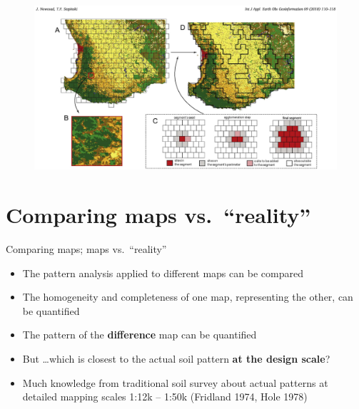 \documentclass[aspectratio=169]{beamer}
\begin{document}
\newpage
    \begin{figure}
        \centering        \includegraphics[height=0.9\textheight]{graphics_david/10.1016.j.jag.2018.03_Fig1.png}
    \end{figure}

\section{Comparing maps vs.\ ``reality''}

\begin{frame}{Comparing maps; maps vs.\ ``reality''}
    \begin{itemize}
        \item The pattern analysis applied to different maps can be compared
        \item The homogeneity and completeness of one map, representing the other, can be quantified
        \item The pattern of the \textbf{difference} map can be quantified
        \item But \ldots which is closest to the actual soil pattern \textbf{at the design scale}?
        \item Much knowledge from traditional soil survey about actual patterns at detailed mapping scales 1:12k -- 1:50k (Fridland 1974, Hole 1978)
    \end{itemize}
\end{frame}
\end{document}
